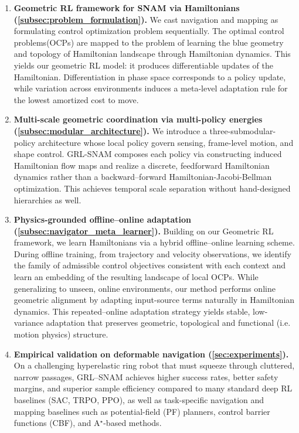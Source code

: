 \begin{enumerate}
\item \textbf{Geometric RL framework for SNAM via Hamiltonians (\cref{subsec:problem_formulation}).}
We cast navigation and mapping as formulating  control optimization problem sequentially.
The optimal control problems(OCPs) are mapped to the problem of learning the blue geometry and topology of Hamiltonian landscape through Hamiltonian dynamics. This yields our geometric RL model: it produces differentiable updates of the Hamiltonian. Differentiation in phase space corresponds to a policy update, while variation across environments induces a meta-level adaptation rule {for the lowest amortized cost to move}.


\item \textbf{Multi-scale geometric coordination via multi-policy energies (\cref{subsec:modular_architecture}).}
We introduce a three-submodular-policy architecture whose local policy govern sensing, frame-level motion, and shape control. GRL-SNAM composes each policy via constructing induced Hamiltonian flow maps and realize a discrete, feedforward Hamiltonian dynamics rather than { a backward--forward Hamiltonian-Jacobi-Bellman  optimization}. This achieves temporal scale separation without hand-designed hierarchies as well.

\item \textbf{Physics-grounded offline--online adaptation (\cref{subsec:navigator_meta_learner}).}
Building on our Geometric RL framework, we learn { Hamiltonians via a hybrid offline--online learning scheme}. During offline training, from trajectory and velocity observations, we identify the family of admissible control objectives consistent with each context and learn an embedding of the resulting landscape of local OCPs. While generalizing to unseen, online environments, our method performs online geometric alignment by adapting input-source terms naturally in Hamiltonian dynamics. This { repeated--online} adaptation strategy yields stable, low-variance adaptation that preserves { geometric, topological and functional (i.e. motion physics)} structure.

\item \textbf{Empirical validation on deformable navigation (\cref{sec:experiments}).}
On a challenging hyperelastic ring robot that must squeeze through cluttered, narrow passages, GRL--SNAM achieves higher success rates, better safety margins, and superior sample efficiency compared to { many} standard deep RL baselines (SAC, {TRPO}, PPO), as well as task-specific navigation and mapping baselines such as potential-field (PF) planners, control barrier functions (CBF), and A$^{\star}$-based methods. 
\end{enumerate}


